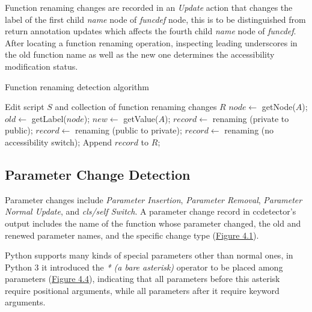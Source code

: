 Function renaming changes are recorded in an \textit{Update} action that changes the label of the first child \textit{name} node of \textit{funcdef} node, this is to be distinguished from return annotation updates which affects the fourth child \textit{name} node of \textit{funcdef}. After locating a function renaming operation, inspecting leading underscores in the old function name as well as the new one determines the accessibility modification status.

\begin{algorithm}
	\label{algo:function-renaming-detection}
	\caption{Function renaming detection algorithm}
	\begin{algorithmic}
		\REQUIRE Edit script $S$ and collection of function renaming changes $R$
			\STATE $node \gets$ getNode($A$);
				\STATE $old \gets$ getLabel($node$);
				\STATE $new \gets$ getValue($A$);
					\STATE $record \gets$ renaming (private to public);
					\STATE $record \gets$ renaming (public to private);
				\ELSE
					\STATE $record \gets$ renaming (no accessibility switch);
				\ENDIF
				\STATE Append $record$ to $R$;
			\ENDIF
		\ENDFOR
	\end{algorithmic}
\end{algorithm}

\subsection{Parameter Change Detection}
\label{subsec:param-change-detect}

Parameter changes include \textit{Parameter Insertion}, \textit{Parameter Removal}, \textit{Parameter Normal Update}, and \textit{cls/self Switch}. A parameter change record in ccdetector's output includes the name of the function whose parameter changed, the old and renewed parameter names, and the specific change type (\hyperref[fig:ccdetector-class-design]{Figure 4.1}).

Python supports many kinds of special parameters other than normal ones, in Python 3 it introduced the \textit{* (a bare asterisk)} operator to be placed among parameters (\hyperref[fig:star-none]{Figure 4.4}), indicating that all parameters before this asterisk require positional arguments, while all parameters after it require keyword arguments.

